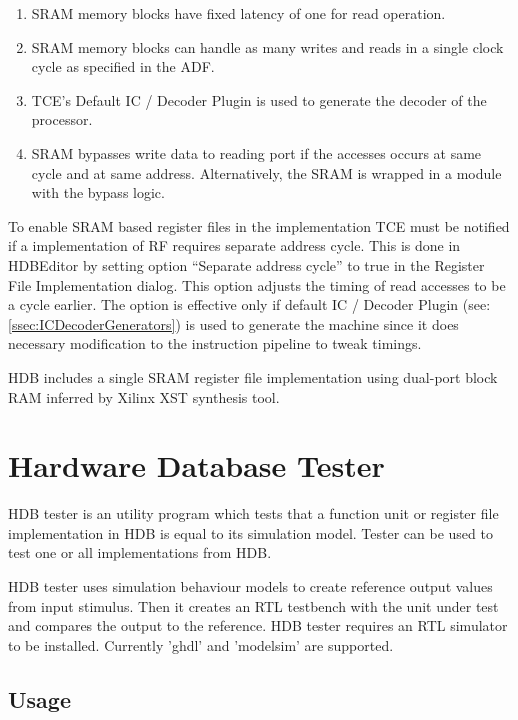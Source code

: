 \documentclass[twoside]{tceusermanual}
\begin{document}
\begin{enumerate}
  \item SRAM memory blocks have fixed latency of one for read operation.
  \item SRAM memory blocks can handle as many writes and reads in a
    single clock cycle as specified in the ADF.
  \item TCE's Default IC / Decoder Plugin is used to generate the
    decoder of the processor.
  \item \label{itm:bypass_req} SRAM bypasses write data to reading
    port if the accesses occurs at same cycle and at same
    address. Alternatively, the SRAM is wrapped in a module with the
    bypass logic.
\end{enumerate}

To enable SRAM based register files in the implementation TCE must be
notified if a implementation of RF requires separate address
cycle. This is done in HDBEditor by setting option ``Separate address
cycle'' to true in the Register File Implementation dialog. This
option adjusts the timing of read accesses to be a cycle earlier. The
option is effective only if default IC / Decoder Plugin (see:
\ref{ssec:ICDecoderGenerators}) is used to generate the machine since
it does necessary modification to the instruction pipeline to tweak
timings.

HDB includes a single SRAM register file implementation using
dual-port block RAM inferred by Xilinx XST synthesis tool.

\section{Hardware Database Tester}
\label{sec:hdbtester}

HDB tester is an utility program which tests that a function unit or register
file implementation in HDB is equal to its simulation model. Tester can be used
to test one or all implementations from HDB.

HDB tester uses simulation behaviour models to create reference output values
from input stimulus. Then it creates an RTL testbench with the unit under test
and compares the output to the reference. HDB tester requires an RTL simulator
to be installed. Currently 'ghdl' and 'modelsim' are supported.

\subsection{Usage}
\end{document}
